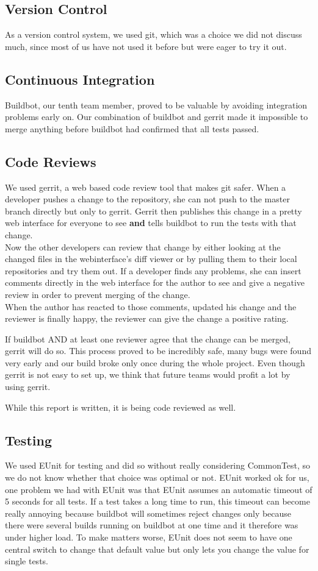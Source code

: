 \documentclass[11pt,a4paper]{report}
\begin{document}
\subsection*{Version Control}
As a version control system, we used git, which was a choice we did not discuss much,
since most of us have not used it before but were eager to try it out.

\subsection*{Continuous Integration}
Buildbot, our tenth team member, proved to be valuable by avoiding integration
problems early on.
Our combination of buildbot and gerrit made it impossible to merge anything
before buildbot had confirmed that all tests passed.
\subsection*{Code Reviews}
We used gerrit, a web based code review tool that makes git safer.
When a developer pushes a change to the repository, she can not push to the
master branch directly but only to gerrit. Gerrit then publishes this change in
a pretty web interface for everyone to see {\bf and} tells buildbot to run
the tests with that change. \\
Now the other developers can review that change by either looking at the changed
files in the webinterface's diff viewer or by pulling them to their local
repositories and try them out.
If a developer finds any problems, she can insert comments directly in the
web interface for the author to see and give a negative review in order to
prevent merging of the change. \\
When the author has reacted to those comments, updated his change and the
reviewer is finally happy, the reviewer can give the change a positive rating.

If buildbot AND at least one reviewer agree that the change can be merged,
gerrit will do so.
This process proved to be incredibly safe, many bugs were found very early and
our build broke only once during the whole project.
Even though gerrit is not easy to set up, we think that future teams would
profit a lot by using gerrit.

While this report is written, it is being code reviewed as well.

\subsection*{Testing}
We used EUnit for testing and did so without really considering
CommonTest, so we do not know whether that choice was optimal or not.
EUnit worked ok for us, one problem we had with EUnit was that EUnit assumes
an automatic timeout of 5 seconds for all tests. If a test takes a long time
to run, this timeout can become really annoying because buildbot will sometimes
reject changes only because there were several builds running on buildbot at
one time and it therefore was under higher load. To make matters worse, EUnit
does not seem to have one central switch to change that default value but only
lets you change the value for single tests.
\end{document}
